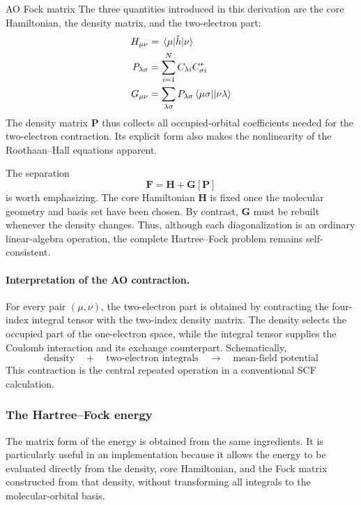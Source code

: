 \documentclass[11pt,a4paper,titlepage]{article}
\numberwithin{equation}{section}
\newcommand{\bF}{\boldsymbol{F}}
\newcommand{\bG}{\boldsymbol{G}}
\newcommand{\bH}{\boldsymbol{H}}
\newcommand{\bP}{\boldsymbol{P}}
\newcommand{\hh}{\Hat{h}}
\begin{document}
\begin{hfsolution}{AO Fock matrix}
The three quantities introduced in this derivation are the core Hamiltonian,
the density matrix, and the two-electron part:
\begin{equation}
\begin{split}
  H_{\mu\nu}&=\mel{\mu}{\hh}{\nu}
  \\
  P_{\lambda\sigma}&=\sum_{i=1}^{N}C_{\lambda i}C_{\sigma i}^*
  \\
  G_{\mu\nu}&=\sum_{\lambda\sigma}P_{\lambda\sigma}
  \mel{\mu\sigma}{}{\nu\lambda}
\end{split}
\end{equation}
The density matrix $\bP$ thus collects all occupied-orbital coefficients
needed for the two-electron contraction. Its explicit form also makes the
nonlinearity of the Roothaan--Hall equations apparent.

The separation
\begin{equation}
  \bF=\bH+\bG[\bP]
\end{equation}
is worth emphasizing. The core Hamiltonian $\bH$ is fixed once the molecular
geometry and basis set have been chosen. By contrast, $\bG$ must be rebuilt
whenever the density changes. Thus, although each diagonalization is an
ordinary linear-algebra operation, the complete Hartree--Fock problem remains
self-consistent.


\end{hfsolution}
\paragraph{Interpretation of the AO contraction.}

For every pair $(\mu,\nu)$, the two-electron part is obtained by contracting
the four-index integral tensor with the two-index density matrix. The density
selects the occupied part of the one-electron space, while the integral tensor
supplies the Coulomb interaction and its exchange counterpart. Schematically,
\begin{equation}
  \boxed{\text{density}
  \quad+\quad
  \text{two-electron integrals}
  \quad\longrightarrow\quad
  \text{mean-field potential}}
\end{equation}
This contraction is the central repeated operation in a conventional SCF
calculation.

\subsubsection{The Hartree--Fock energy}

The matrix form of the energy is obtained from the same ingredients. It is
particularly useful in an implementation because it allows the energy to be
evaluated directly from the density, core Hamiltonian, and the Fock matrix
constructed from that density, without transforming all integrals to the
molecular-orbital basis.
\end{document}
